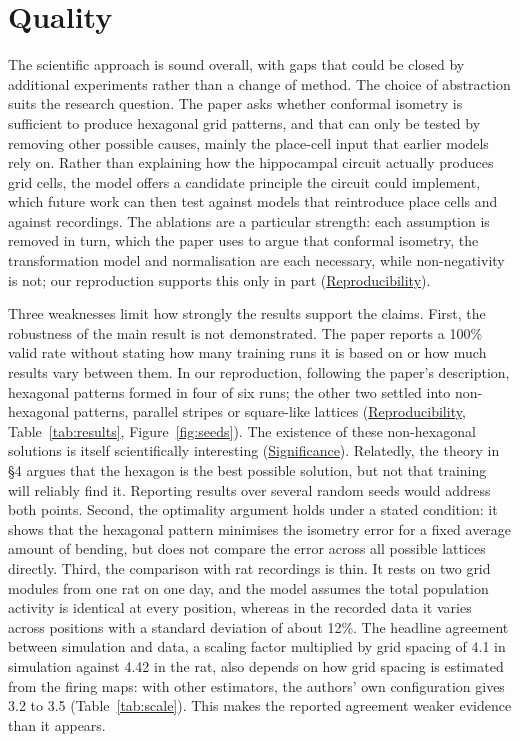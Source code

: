 \documentclass[10pt,letterpaper]{article}
\begin{document}
\section{Quality} \label{sec:quality}
The scientific approach is sound overall, with gaps that could be closed by additional experiments rather than a change of method. The choice of abstraction suits the research question. The paper asks whether conformal isometry is sufficient to produce hexagonal grid patterns, and that can only be tested by removing other possible causes, mainly the place-cell input that earlier models rely on. Rather than explaining how the hippocampal circuit actually produces grid cells, the model offers a candidate principle the circuit could implement, which future work can then test against models that reintroduce place cells and against recordings. The ablations are a particular strength: each assumption is removed in turn, which the paper uses to argue that conformal isometry, the transformation model and normalisation are each necessary, while non-negativity is not; our reproduction supports this only in part (\hyperref[sec:released]{Reproducibility}).

Three weaknesses limit how strongly the results support the claims. First, the robustness of the main result is not demonstrated. The paper reports a 100\% valid rate without stating how many training runs it is based on or how much results vary between them. In our reproduction, following the paper’s description, hexagonal patterns formed in four of six runs; the other two settled into non-hexagonal patterns, parallel stripes or square-like lattices (\hyperref[sec:repro]{Reproducibility}, Table~\ref{tab:results}, Figure~\ref{fig:seeds}). The existence of these non-hexagonal solutions is itself scientifically interesting (\hyperref[sec:significance]{Significance}). Relatedly, the theory in §4 argues that the hexagon is the best possible solution, but not that training will reliably find it. Reporting results over several random seeds would address both points. Second, the optimality argument holds under a stated condition: it shows that the hexagonal pattern minimises the isometry error for a fixed average amount of bending, but does not compare the error across all possible lattices directly. Third, the comparison with rat recordings is thin. It rests on two grid modules from one rat on one day, and the model assumes the total population activity is identical at every position, whereas in the recorded data it varies across positions with a standard deviation of about 12\%. The headline agreement between simulation and data, a scaling factor multiplied by grid spacing of 4.1 in simulation against 4.42 in the rat, also depends on how grid spacing is estimated from the firing maps: with other estimators, the authors’ own configuration gives 3.2 to 3.5 (Table~\ref{tab:scale}). This makes the reported agreement weaker evidence than it appears.
\end{document}
